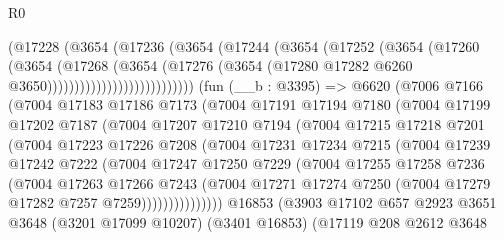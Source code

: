 \begin{lexlean}{R0}
\begin{coremodule}
                            (@17228
                              (@3654
                                (@17236
                                  (@3654
                                    (@17244
                                      (@3654
                                        (@17252
                                          (@3654
                                            (@17260
                                              (@3654
                                                (@17268
                                                  (@3654
                                                    (@17276
                                                      (@3654
                                                        (@17280
                                                          @17282
                                                          @6260
                                                          @3650)))))))))))))))))))))))))))
    (fun (__b : @3395) =>
    @6620
      (@7006
        @7166
        (@7004
          @17183
          @17186
          @7173
          (@7004
            @17191
            @17194
            @7180
            (@7004
              @17199
              @17202
              @7187
              (@7004
                @17207
                @17210
                @7194
                (@7004
                  @17215
                  @17218
                  @7201
                  (@7004
                    @17223
                    @17226
                    @7208
                    (@7004
                      @17231
                      @17234
                      @7215
                      (@7004
                        @17239
                        @17242
                        @7222
                        (@7004
                          @17247
                          @17250
                          @7229
                          (@7004
                            @17255
                            @17258
                            @7236
                            (@7004
                              @17263
                              @17266
                              @7243
                              (@7004
                                @17271
                                @17274
                                @7250
                                (@7004 @17279 @17282 @7257 @7259)))))))))))))))
    @16853
    (@3903
      @17102
      @657
      @2923
      @3651
      @3648
      (@3201 @17099 @10207)
      (@3401 @16853)
      (@17119
        @208
        @2612
        @3648

\end{coremodule}
\end{lexlean}
